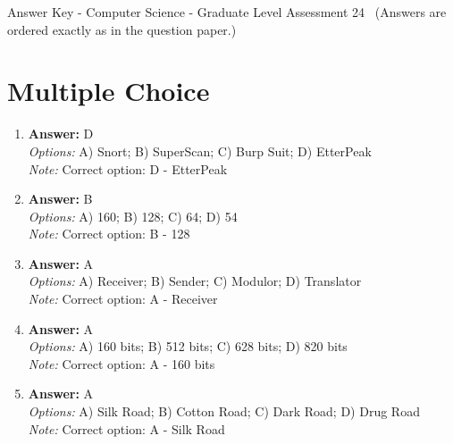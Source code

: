 \documentclass[12pt]{article}
\begin{document}
\begin{center}
Answer Key - Computer Science - Graduate Level Assessment 24 \
\small (Answers are ordered exactly as in the question paper.)
\end{center}

\section*{Multiple Choice}
\begin{enumerate}[label=\arabic*.]
\item \textbf{Answer:} D
\\ \textit{Options:} A) Snort; B) SuperScan; C) Burp Suit; D) EtterPeak
\\ \textit{Note:} Correct option: D - EtterPeak
\item \textbf{Answer:} B
\\ \textit{Options:} A) 160; B) 128; C) 64; D) 54
\\ \textit{Note:} Correct option: B - 128
\item \textbf{Answer:} A
\\ \textit{Options:} A) Receiver; B) Sender; C) Modulor; D) Translator
\\ \textit{Note:} Correct option: A - Receiver
\item \textbf{Answer:} A
\\ \textit{Options:} A) 160 bits; B) 512 bits; C) 628 bits; D) 820 bits
\\ \textit{Note:} Correct option: A - 160 bits
\item \textbf{Answer:} A
\\ \textit{Options:} A) Silk Road; B) Cotton Road; C) Dark Road; D) Drug Road
\\ \textit{Note:} Correct option: A - Silk Road
\end{enumerate}
\end{document}
